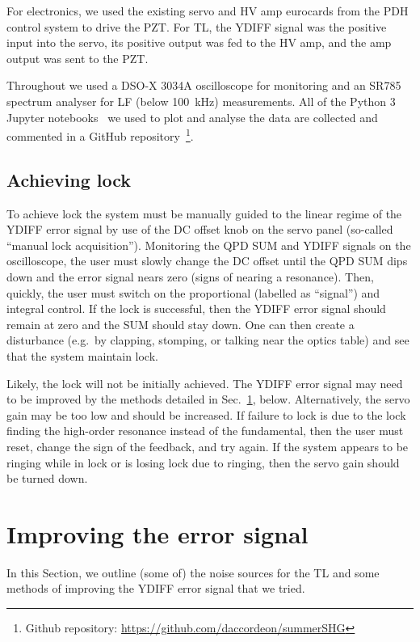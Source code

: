 \documentclass[aps,pra,superscriptaddress,reprint,nofootinbib]{revtex4-1}
\begin{document}
For electronics, we used the existing servo and HV amp eurocards from the PDH control system to drive the PZT. For TL, the YDIFF signal was the positive input into the servo, its positive output was fed to the HV amp, and the amp output was sent to the PZT.

Throughout we used a DSO-X 3034A oscilloscope for monitoring and an SR785 spectrum analyser for LF (below 100~kHz) measurements. All of the Python 3 Jupyter notebooks~\cite{python,ipython,jupyter} we used to plot and analyse the data are collected and commented in a GitHub repository~\footnote{Github repository: \url{https://github.com/daccordeon/summerSHG}}.


\subsection{Achieving lock}

To achieve lock the system must be manually guided to the linear regime of the YDIFF error signal by use of the DC offset knob on the servo panel (so-called “manual lock acquisition”). Monitoring the QPD SUM and YDIFF signals on the oscilloscope, the user must slowly change the DC offset until the QPD SUM dips down and the error signal nears zero (signs of nearing a resonance). Then, quickly, the user must switch on the proportional (labelled as “signal”) and integral control. If the lock is successful, then the YDIFF error signal should remain at zero and the SUM should stay down. One can then create a disturbance (e.g.\ by clapping, stomping, or talking near the optics table) and see that the system maintain lock. 


Likely, the lock will not be initially achieved. The YDIFF error signal may need to be improved by the methods detailed in Sec.~\ref{sec:error_signal}, below. Alternatively, the servo gain may be too low and should be increased. If failure to lock is due to the lock finding the high-order resonance instead of the fundamental, then the user must reset, change the sign of the feedback, and try again. If the system appears to be ringing while in lock or is losing lock due to ringing, then the servo gain should be turned down.


\section{Improving the error signal}
\label{sec:error_signal}

In this Section, we outline (some of) the noise sources for the TL and some methods of improving the YDIFF error signal that we tried.
\end{document}
